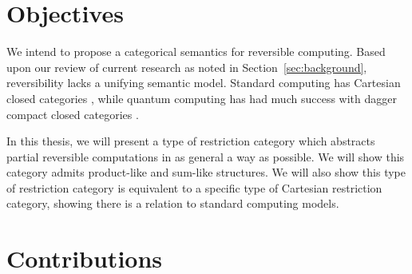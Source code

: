 \section{Objectives}
\label{sec:objectives}

We intend to propose a categorical semantics for reversible computing. Based upon our review of
current research as noted in Section~\ref{sec:background}, reversibility lacks a unifying semantic
model. Standard computing has Cartesian closed categories \cite{barr:ctcs}, while quantum computing
has had much success with dagger compact closed categories
\cite{selinger04:towardssemantics,selinger05:dagger,abramsky05:abstractscalars}.

In this thesis, we will present a type of restriction category which abstracts partial reversible
computations in as general a way as possible. We will show this category admits product-like and
sum-like structures. We will also show this type of restriction category is equivalent to a specific
type of Cartesian restriction category, showing there is a relation to standard computing models.

\section{Contributions}
\label{sec:contributions}


